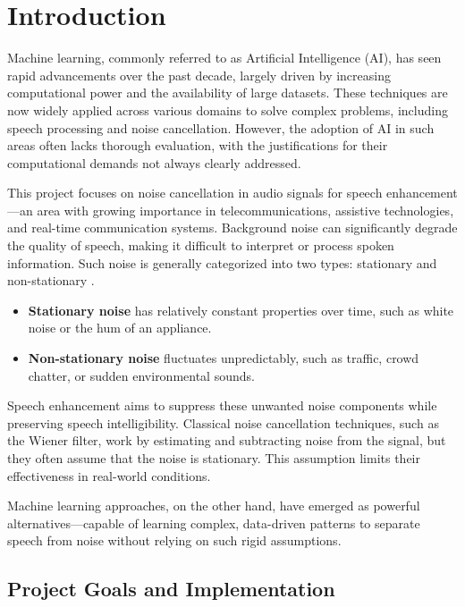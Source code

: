 \graphicspath{{content/chapters/1_introduction/figures}}
\chapter{Introduction}
\label{chp:introduction}

Machine learning, commonly referred to as Artificial Intelligence (AI), has seen rapid advancements over the past decade, largely driven by increasing computational power and the availability of large datasets. These techniques are now widely applied across various domains to solve complex problems, including speech processing and noise cancellation. However, the adoption of AI in such areas often lacks thorough evaluation, with the justifications for their computational demands not always clearly addressed.

This project focuses on noise cancellation in audio signals for speech enhancement—an area with growing importance in telecommunications, assistive technologies, and real-time communication systems. Background noise can significantly degrade the quality of speech, making it difficult to interpret or process spoken information. Such noise is generally categorized into two types: stationary and non-stationary \cite{loizou2013speech}.

\begin{itemize}
    \item \textbf{Stationary noise} has relatively constant properties over time, such as white noise or the hum of an appliance.
    \item \textbf{Non-stationary noise} fluctuates unpredictably, such as traffic, crowd chatter, or sudden environmental sounds.
\end{itemize}

Speech enhancement aims to suppress these unwanted noise components while preserving speech intelligibility. Classical noise cancellation techniques, such as the Wiener filter, work by estimating and subtracting noise from the signal, but they often assume that the noise is stationary. This assumption limits their effectiveness in real-world conditions. 

Machine learning approaches, on the other hand, have emerged as powerful alternatives—capable of learning complex, data-driven patterns to separate speech from noise without relying on such rigid assumptions.

\section{Project Goals and Implementation}

